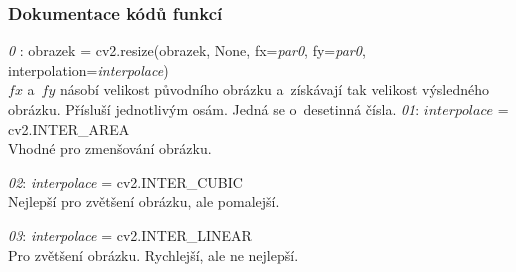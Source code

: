 \documentclass[12pt,oneside]{report}			%
\begin{document}
	\subsubsection{Dokumentace kódů funkcí}
	\label{sec:docs}
	\begin{outline}
\1 \emph{0} : obrazek = cv2.resize(obrazek, None, fx=\emph{par0}, fy=\emph{par0}, \\interpolation=\emph{interpolace})\\
	$fx$ a~$fy$ násobí velikost původního obrázku a~získávají tak velikost výsledného obrázku. Přísluší jednotlivým osám. Jedná se o~desetinná čísla. \parencite{CV_resize}
	\2 \emph{01}: $interpolace$ = cv2.INTER\_AREA\\ Vhodné pro zmenšování obrázku.
	
	\2 \emph{02}: \emph{interpolace} = cv2.INTER\_CUBIC\\ Nejlepší pro zvětšení obrázku, ale pomalejší.
	
	\2 \emph{03}: \emph{interpolace} = cv2.INTER\_LINEAR\\ Pro zvětšení obrázku. Rychlejší, ale ne nejlepší.  
	

\end{outline}
\end{document}
